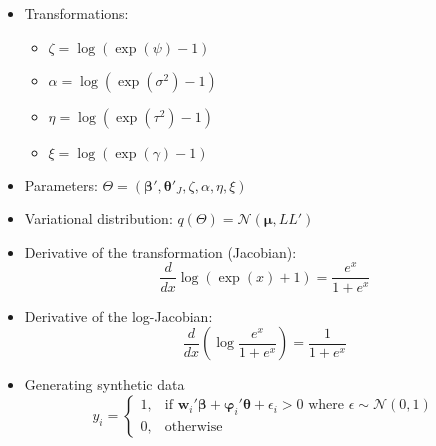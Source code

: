 \documentclass{elsarticle}
\begin{document}
\begin{itemize}
\begin{itemize}
  \end{itemize}
  \item Transformations:
  \begin{itemize}
    \item $\zeta = \log(\exp(\psi)-1)$
    \item $\alpha=\log(\exp(\sigma^{2})-1)$
    \item $\eta = \log(\exp(\tau^{2})-1)$
    \item $\xi = \log(\exp(\gamma)-1)$
  \end{itemize}
  \item Parameters: $\Theta = \left(\bm{\beta}',\bm{\theta}'_{J},\zeta,\alpha,\eta,\xi\right)$
  \item Variational distribution: $q(\Theta)=\mathcal{N}(\bm{\mu},LL')$
  \item Derivative of the transformation (Jacobian):
  \begin{equation}
    \dfrac{d}{dx}\log(\exp(x)+1) = \dfrac{e^{x}}{1+e^{x}}
  \end{equation}
  \item Derivative of the log-Jacobian:
  \begin{equation}
  \dfrac{d}{dx}\left(\log\dfrac{e^{x}}{1+e^{x}}\right)=\dfrac{1}{1+e^{x}}
  \end{equation}
  \item Generating synthetic data
  \begin{equation}
    y_{i} = \begin{cases}1, & \text{if $\mathbf{w}_{i}'\bm{\beta}+\bm{\varphi}_{i}'\bm{\theta}+\epsilon_{i} > 0$ where $\epsilon\sim\mathcal{N}(0,1)$}\\ 0, & \text{otherwise}\end{cases}
  \end{equation}
\end{itemize}
\end{document}
